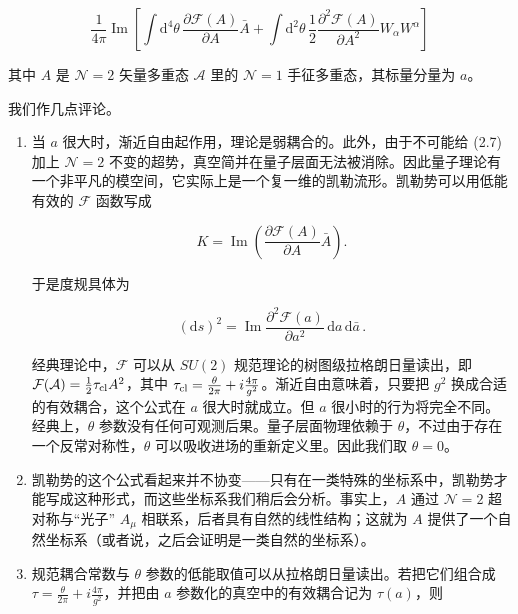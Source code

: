 \documentclass[11pt,a4paper,UTF8,fontset=fandol]{ctexart}
\theoremstyle{plain}
\theoremstyle{definition}
\begin{document}
\begin{equation}
\frac{1}{4\pi}\operatorname{Im}\left[\int \mathrm{d}^4\theta\,\frac{\partial\mathcal F(A)}{\partial A}\bar A+\int \mathrm{d}^2\theta\,\frac12\frac{\partial^2\mathcal F(A)}{\partial A^2}W_\alpha W^\alpha\right]\tag{2.7}
\end{equation}

其中 $A$ 是 $\mathcal N=2$ 矢量多重态 $\mathcal A$ 里的 $\mathcal N=1$ 手征多重态，其标量分量为 $a$。

我们作几点评论。

\begin{enumerate}
\item 当 $a$ 很大时，渐近自由起作用，理论是弱耦合的。此外，由于不可能给 (2.7) 加上 $\mathcal N=2$ 不变的超势，真空简并在量子层面无法被消除。因此量子理论有一个非平凡的模空间，它实际上是一个复一维的凯勒流形。凯勒势可以用低能有效的 $\mathcal F$ 函数写成

\begin{equation}
K=\operatorname{Im}\left(\frac{\partial\mathcal F(A)}{\partial A}\bar A\right).\tag{2.8}
\end{equation}

于是度规具体为

\begin{equation}
(\mathrm{d}s)^2=\operatorname{Im}\frac{\partial^2\mathcal F(a)}{\partial a^2}\,\mathrm{d}a\,\mathrm{d}\bar a\,.\tag{2.9}
\end{equation}

经典理论中，$\mathcal F$ 可以从 $SU(2)$ 规范理论的树图级拉格朗日量读出，即 $\mathcal F(\mathcal A)=\frac12\tau_{\rm cl}A^2$，其中 $\tau_{\rm cl}=\frac{\theta}{2\pi}+i\frac{4\pi}{g^2}$。渐近自由意味着，只要把 $g^2$ 换成合适的有效耦合，这个公式在 $a$ 很大时就成立。但 $a$ 很小时的行为将完全不同。经典上，$\theta$ 参数没有任何可观测后果。量子层面物理依赖于 $\theta$，不过由于存在一个反常对称性，$\theta$ 可以吸收进场的重新定义里。因此我们取 $\theta=0$。

\item 凯勒势的这个公式看起来并不协变——只有在一类特殊的坐标系中，凯勒势才能写成这种形式，而这些坐标系我们稍后会分析。事实上，$A$ 通过 $\mathcal N=2$ 超对称与“光子” $A_\mu$ 相联系，后者具有自然的线性结构；这就为 $A$ 提供了一个自然坐标系（或者说，之后会证明是一类自然的坐标系）。

\item 规范耦合常数与 $\theta$ 参数的低能取值可以从拉格朗日量读出。若把它们组合成 $\tau=\frac{\theta}{2\pi}+i\frac{4\pi}{g^2}$，并把由 $a$ 参数化的真空中的有效耦合记为 $\tau(a)$，则


\end{enumerate}
\end{document}
